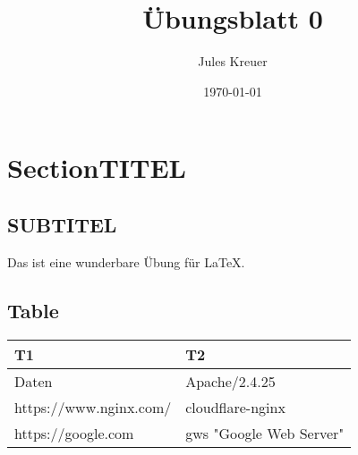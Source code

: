 \documentclass[a4paper]{article}
\begin{document}
\author{Jules Kreuer} %
\title{\vspace{-2cm}Übungsblatt 0}
\date{\today{}} %
\maketitle{} %

\section{SectionTITEL}
\subsection{SUBTITEL}
Das ist eine wunderbare Übung für LaTeX.
\subsection{Table}
 \begin{tabular}{|l|l|}
 	\hline
	T1 & T2\\
	\hline
	Daten &  Apache/2.4.25 \\
	\hline
	https://www.nginx.com/ & cloudflare-nginx \\
	\hline
	https://google.com & gws "Google Web Server" \\
	\hline
\end{tabular}
\end{document}
